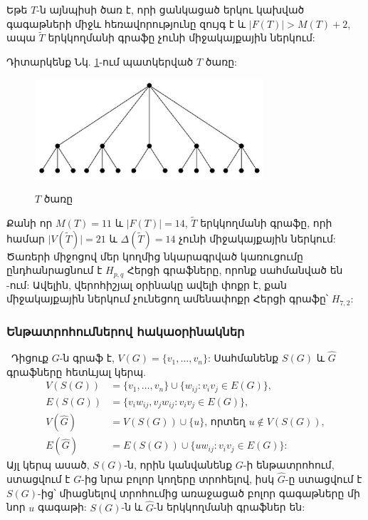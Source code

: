 \begin{corollary}
\label{c3_tree} Եթե $T$-ն այնպիսի ծառ է, որի ցանկացած երկու կախված գագաթների միջև հեռավորությունը զույգ է և $\vert F(T)\vert >
M(T)+2$, ապա $\widetilde{T}$ երկկողմանի գրաֆը չունի միջակայքային ներկում:
\end{corollary}

Դիտարկենք Նկ. \ref{f3_tree}-ում պատկերված $T$ ծառը:

\begin{figure}[h]
\begin{center}
\includegraphics[width=20pc]{figures/tree.eps}\\
\caption{$T$ ծառը}\label{f3_tree}
\end{center}
\end{figure}


Քանի որ $M(T)=11$ և $\vert F(T)\vert=14$,
$\widetilde{T}$ երկկողմանի գրաֆը, որի համար $\vert V(\widetilde{T})\vert=21$ և
$\Delta(\widetilde{T})=14$ չունի միջակայքային ներկում: Ծառերի միջոցով մեր կողմից նկարագրված կառուցումը ընդհանրացնում է $H_{p,q}$ Հերցի գրաֆները, որոնք սահմանված են 
\cite{GiaroKubaleMalafiejski1999}-ում: Ավելին, վերոհիշյալ օրինակը ավելի փոքր է, քան միջակայքային ներկում չունեցող ամենափոքր Հերցի գրաֆը՝ $H_{7,2}$:





\subsubsection{Ենթատրոհումներով հակաօրինակներ}\
Դիցուք $G$-ն գրաֆ է, $V(G)=\{v_{1},\ldots,v_{n}\}$: Սահմանենք 
$S(G)$ և $\widehat{G}$ գրաֆները հետևյալ կերպ.
\begin{align*}
V(S(G))&=\{v_{1},\ldots,v_{n}\}\cup \{w_{ij}:v_{i}v_{j}\in E(G)\},\\
E(S(G))&=\{v_{i}w_{ij},v_{j}w_{ij}:v_{i}v_{j}\in E(G)\},\\
V(\widehat{G})&=V(S(G))\cup \{u\}\text{, որտեղ } u\notin V(S(G)),\\
E(\widehat{G})&=E(S(G))\cup \{uw_{ij}:v_{i}v_{j}\in E(G)\}:
\end{align*}
Այլ կերպ ասած, $S(G)$-ն, որին կանվանենք $G$-ի ենթատրոհում, ստացվում է $G$-ից նրա բոլոր կողերը տրոհելով, իսկ $\widehat{G}$-ը ստացվում է $S(G)$-ից՝ միացնելով տրոհումից առաջացած բոլոր գագաթները մի նոր $u$ գագաթի: 
$S(G)$-ն և $\widehat{G}$-ն երկկողմանի գրաֆներ են:

